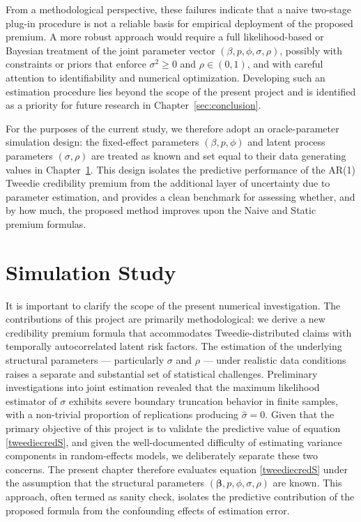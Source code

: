\documentclass{sfuthesis}
\numberwithin{equation}{chapter}
\begin{document}

From a methodological perspective, these failures indicate that a naive two-stage plug-in procedure is not a reliable basis for empirical deployment of the proposed premium. A more robust approach would require a full likelihood-based or Bayesian treatment of the joint parameter vector $(\beta, p, \phi, \sigma, \rho)$, possibly with constraints or priors that enforce $\sigma^2 \ge 0$ and $\rho \in (0,1)$, and with careful attention to identifiability and numerical optimization. Developing such an estimation procedure lies beyond the scope of the present project and is identified as a priority for future research in Chapter~\ref{sec:conclusion}.

For the purposes of the current study, we therefore adopt an oracle-parameter simulation design: the fixed-effect parameters $(\beta, p, \phi)$ and latent process parameters $(\sigma, \rho)$ are treated as known and set equal to their data generating values in Chapter~\ref{sec:sim_study}. This design isolates the predictive performance of the AR(1) Tweedie credibility premium from the additional layer of uncertainty due to parameter estimation, and provides a clean benchmark for assessing whether, and by how much, the proposed method improves upon the Naive and Static premium formulas.

\pagebreak



\chapter{Simulation Study}
\label{sec:sim_study}


It is important to clarify the scope of the present numerical investigation. The contributions of this project are primarily methodological: we derive a new credibility premium formula that accommodates Tweedie-distributed claims with temporally autocorrelated latent risk factors. The estimation of the underlying structural parameters --- particularly $\sigma$ and $\rho$ --- under realistic data conditions raises a separate and substantial set of statistical challenges. Preliminary investigations into joint estimation revealed that the maximum likelihood estimator of $\sigma$ exhibits severe boundary truncation behavior in finite samples, with a non-trivial proportion of replications producing $\hat{\sigma} = 0$. Given that the primary objective of this project is to validate the predictive value of equation \eqref{tweediecredS}, and given the well-documented difficulty of estimating variance components in random-effects models, we deliberately separate these two concerns. The present chapter therefore evaluates equation \eqref{tweediecredS} under the assumption that the structural parameters $(\bm{\beta}, p, \phi, \sigma, \rho)$ are known. This approach, often termed as sanity check, isolates the predictive contribution of the proposed formula from the confounding effects of estimation error.
\end{document}
